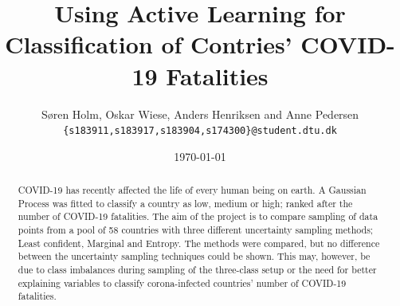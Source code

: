 \documentclass[fleqn]{article}
\title{\vspace*{-3.75cm} Using Active Learning for Classification of Contries' COVID-19 Fatalities}
\author{Søren Holm, Oskar Wiese, Anders Henriksen and Anne Pedersen \\
\small {\texttt{\{s183911,s183917,s183904,s174300\}@student.dtu.dk}}}
\date{\today}
\begin{document}
\fontsize{12}{14}\rm

\maketitle

\begin{abstract} %
	\noindent COVID-19 has recently affected the life of every human being on earth. A Gaussian Process was fitted to classify a country as low, medium or high; ranked after the number of COVID-19 fatalities. The aim of the project is to compare sampling of data points from a pool of 58 countries with three different uncertainty sampling methods; Least confident, Marginal and Entropy. The methods were compared, but no difference between the uncertainty sampling techniques could be shown. This may, however, be due to class imbalances during sampling of the three-class setup or the need for better explaining variables to classify corona-infected countries' number of COVID-19 fatalities.
\end{abstract}
\end{document}
